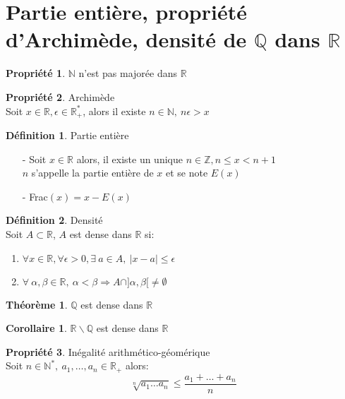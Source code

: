 \documentclass[fleqn]{article}
\theoremstyle{definition} \newtheorem*{defi}{D\'efinition}
\theoremstyle{definition} \newtheorem*{theo}{Th\'eor\`eme}
\theoremstyle{definition} \newtheorem*{coro}{Corollaire}
\theoremstyle{remark} \newtheorem*{rqs}{Remarques}
\theoremstyle{definition} \newtheorem*{prop}{Propri\'et\'e}
\begin{document}
\section{Partie entière, propri\'et\'e d'Archim\`ede, densit\'e de $\mathbb{Q}$ dans $\mathbb{R}$}
\begin{prop}
	$\mathbb{N}$ n'est pas major\'ee dans $\mathbb{R}$
\end{prop}
\begin{prop} Archim\`ede \\
	Soit $x \in \mathbb{R}, \epsilon \in \mathbb{R}_+^*$, alors il existe $n \in \mathbb{N},\ n\epsilon>x$
\end{prop}
\begin{defi} Partie enti\`ere
	\begin{itemize}
		\item [-] Soit $x \in \mathbb{R}$ alors, il existe un unique $n \in \mathbb{Z}, n \leq x < n+1$ \\
			$n$ s'appelle la partie enti\`ere de $x$ et se note $E(x)$
		\item [-] Frac$(x) = x - E(x)$
	\end{itemize}
\end{defi}
\begin{defi} Densit\'e \\
	Soit $A \subset \mathbb{R}$, $A$ est dense dans $\mathbb{R}$ si:
	\begin{enumerate}
		\item $\forall x \in \mathbb{R}, \forall \epsilon > 0, \exists\ a \in A,\ |x-a| \leq \epsilon$
		\item $\forall\ \alpha,\beta \in \mathbb{R},\ \alpha < \beta \Rightarrow A \cap ]\alpha, \beta[ \neq \emptyset$
	\end{enumerate}
	\begin{theo} $\mathbb{Q}$ est dense dans $\mathbb{R}$ \end{theo}
	\begin{coro} $\mathbb{R}\backslash \mathbb{Q}$ est dense dans $\mathbb{R}$ \end{coro}
\end{defi}

\begin{prop} In\'egalit\'e arithm\'etico-g\'eom\'erique\\
	Soit $n \in \mathbb{N}^*,\ a_1, \hdots, a_n \in \mathbb{R}_+$ alors:
	\[\sqrt[n]{a_1 \hdots a_n} \leq \frac{a_1 + \hdots + a_n}{n}\]

\end{prop}
\end{document}
